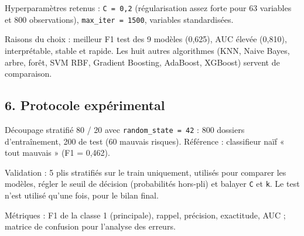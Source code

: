 \documentclass[
]{article}
\begin{document}
Hyperparamètres retenus : \texttt{C\ =\ 0,2} (régularisation assez forte
pour 63 variables et 800 observations), \texttt{max\_iter\ =\ 1500},
variables standardisées.

Raisons du choix : meilleur F1 test des 9 modèles (0,625), AUC élevée
(0,810), interprétable, stable et rapide. Les huit autres algorithmes
(KNN, Naive Bayes, arbre, forêt, SVM RBF, Gradient Boosting, AdaBoost,
XGBoost) servent de comparaison.

\subsection{6. Protocole expérimental}\label{protocole-expuxe9rimental}

Découpage stratifié 80 / 20 avec \texttt{random\_state\ =\ 42} : 800
dossiers d'entraînement, 200 de test (60 mauvais risques). Référence :
classifieur naïf « tout mauvais » (F1 = 0,462).

Validation : 5 plis stratifiés sur le train uniquement, utilisés pour
comparer les modèles, régler le seuil de décision (probabilités
hors-pli) et balayer \texttt{C} et \texttt{k}. Le test n'est utilisé
qu'une fois, pour le bilan final.

Métriques : F1 de la classe 1 (principale), rappel, précision,
exactitude, AUC ; matrice de confusion pour l'analyse des erreurs.
\end{document}
